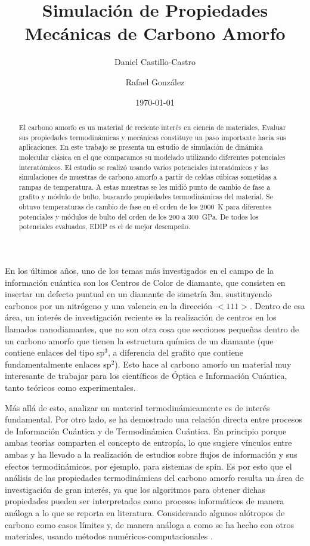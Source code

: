 \documentclass[aps,prl,twocolumn,superscriptaddress,groupedaddress]{revtex4}
\begin{document}
\title{Simulación de Propiedades Mecánicas de Carbono Amorfo}
\author{Daniel Castillo-Castro} 
\author{Rafael González} 
     
\date{\today}
\begin{abstract}
El carbono amorfo es un material de reciente interés en ciencia de materiales. Evaluar sus propiedades termodinámicas y mecánicas constituye un paso importante hacia sus aplicaciones. En este trabajo se presenta un estudio de simulación de dinámica molecular clásica en el que comparamos su modelado utilizando diferentes potenciales interatómicos. El estudio se realizó usando varios potenciales interatómicos y las simulaciones de muestras de carbono amorfo a partir de celdas cúbicas sometidas a rampas de temperatura. A estas muestras se les midió punto de cambio de fase a grafito y módulo de bulto, buscando propiedades termodinámicas del material. Se obtuvo temperaturas de cambio de fase en el orden de los 2000~K para diferentes potenciales y módulos de bulto del orden de los 200 a 300~GPa. De todos los potenciales evaluados, EDIP es el de mejor desempeño.
\end{abstract}

\maketitle
En los últimos años, uno de los temas más investigados en el campo de la información cuántica son los Centros de Color de diamante, que consisten en insertar un defecto puntual en un diamante de simetría 3m, sustituyendo carbonos por un nitrógeno y una valencia en la dirección $<111>$.\cite{NVDiamond} Dentro de esa área, un interés de investigación reciente es la realización de centros en los llamados nanodiamantes, que no son otra cosa que secciones pequeñas dentro de un carbono amorfo que tienen la estructura química de un diamante (que contiene enlaces del tipo sp$^3$, a diferencia del grafito que contiene fundamentalmente enlaces sp$^2$). Esto hace al carbono amorfo un material muy interesante de trabajar para los científicos de Óptica e Información Cuántica, tanto teóricos como experimentales.

Más allá de esto, analizar un material termodinámicamente es de interés fundamental. Por otro lado, se ha demostrado una relación directa entre procesos de Información Cuántica y de Termodinámica Cuántica. En principio porque ambas teorías comparten el concepto de entropía, lo que sugiere vínculos entre ambas \cite{QTh} y ha llevado a la realización de estudios sobre flujos de información y sus efectos termodinámicos, por ejemplo, para sistemas de spin. \cite{ThermoQIFlow} Es por esto que el análisis de las propiedades termodinámicas del carbono amorfo resulta un área de investigación de gran interés, ya que los algoritmos para obtener dichas propiedades pueden ser interpretados como procesos informáticos de manera análoga a lo que se reporta en literatura. Considerando algunos alótropos de carbono como casos límites y, de manera análoga a como se ha hecho con otros materiales, usando métodos numéricos-computacionales \cite{ThermoFlow}. 
\end{document}
